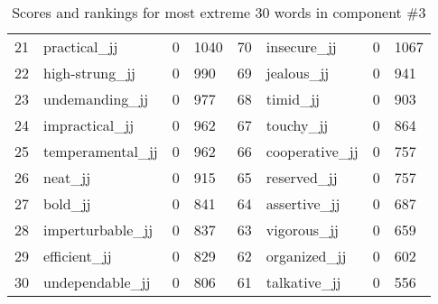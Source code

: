 \begin{table}[tbp]
\begin{tabular}{| rlr@{.}l | rlr@{.}l |}
    21 & practical\_jj & 0 & 1040    &    70 & insecure\_jj & 0 & 1067 \\
    22 & high-strung\_jj & 0 & 990    &    69 & jealous\_jj & 0 & 941 \\
    23 & undemanding\_jj & 0 & 977    &    68 & timid\_jj & 0 & 903 \\
    24 & impractical\_jj & 0 & 962    &    67 & touchy\_jj & 0 & 864 \\
    25 & temperamental\_jj & 0 & 962    &    66 & cooperative\_jj & 0 & 757 \\
    26 & neat\_jj & 0 & 915    &    65 & reserved\_jj & 0 & 757 \\
    27 & bold\_jj & 0 & 841    &    64 & assertive\_jj & 0 & 687 \\
    28 & imperturbable\_jj & 0 & 837    &    63 & vigorous\_jj & 0 & 659 \\
    29 & efficient\_jj & 0 & 829    &    62 & organized\_jj & 0 & 602 \\
    30 & undependable\_jj & 0 & 806    &    61 & talkative\_jj & 0 & 556 \\
    \hline
    \end{tabular}
    \caption{Scores and rankings for most extreme 30 words in component \#3} 
\end{table}
\clearpage
